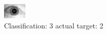 \begin{figure}[h!]
\begin{center}
\includegraphics[width=0.60\columnwidth]{figures/ID1736_class_3_target_2.png}
\end{center}
\caption{ Classification: 3 actual target: 2}
\label{fig:ID1736_class_3_target_2}
\end{figure}
